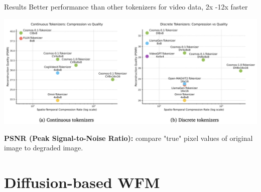 \documentclass{beamer}
\begin{document}
\begin{frame}[t]{Results}
    Better performance than other tokenizers for video data, 2x -12x faster \newline
    \begin{center}
        \includegraphics[width=\textwidth]{./img/tokenizer_res.png}
    \end{center}
    \textbf{PSNR (Peak Signal-to-Noise Ratio):} compare "true" pixel values of original image to degraded image.
\end{frame}
\section{Diffusion-based WFM}
\end{document}

